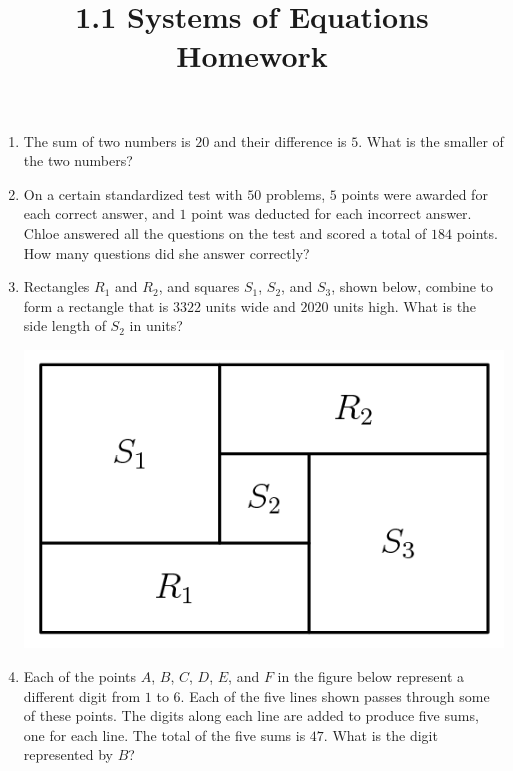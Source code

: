 \documentclass{article}
\title{1.1 Systems of Equations Homework}
\author{}
\date{}
\begin{document}
\maketitle
\begin{enumerate}
    \item The sum of two numbers is $20$ and their difference is $5$.
        What is the smaller of the two numbers?
        \vspace{3cm}
    \item On a certain standardized test with $50$ problems, $5$ points were awarded for each correct answer, and $1$ point was deducted for each incorrect answer.
        Chloe answered all the questions on the test and scored a total of $184$ points.
        How many questions did she answer correctly?
        \vspace{3cm}
    \item Rectangles $R_1$ and $R_2$, and squares $S_1$, $S_2$, and $S_3$, shown below, combine to form a rectangle that is $3322$ units wide and $2020$ units high.
        What is the side length of $S_2$ in units?
        \begin{center}
            \includegraphics[scale=0.2]{1-1rectangles.png}
        \end{center}
        \vspace{3cm}
    \item Each of the points $A$, $B$, $C$, $D$, $E$, and $F$ in the figure below represent a different digit from $1$ to $6$.
        Each of the five lines shown passes through some of these points.
        The digits along each line are added to produce five sums, one for each line.
        The total of the five sums is $47$.
        What is the digit represented by $B$?
        \begin{center}

\end{center}
\end{enumerate}
\end{document}
